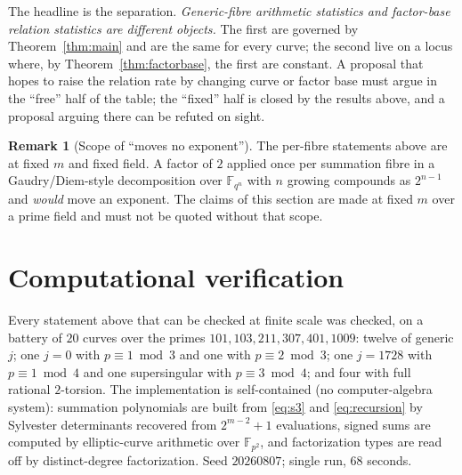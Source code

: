 \documentclass[11pt,a4paper]{article}
\theoremstyle{plain}
\theoremstyle{definition}
\newtheorem{remark}[theorem]{Remark}
\newcommand{\FF}{\mathbb{F}}
\begin{document}
The headline is the separation. \emph{Generic-fibre arithmetic statistics and
factor-base relation statistics are different objects.} The first are governed by
Theorem~\ref{thm:main} and are the same for every curve; the second live on a
locus where, by Theorem~\ref{thm:factorbase}, the first are constant. A proposal
that hopes to raise the relation rate by changing curve or factor base must argue
in the ``free'' half of the table; the ``fixed'' half is closed by the results
above, and a proposal arguing there can be refuted on sight.

\begin{remark}[Scope of ``moves no exponent'']
The per-fibre statements above are at fixed $m$ and fixed field. A factor of $2$
applied once per summation fibre in a Gaudry/Diem-style decomposition over
$\FF_{q^n}$ with $n$ growing compounds as $2^{n-1}$ and \emph{would} move an
exponent. The claims of this section are made at fixed $m$ over a prime field and
must not be quoted without that scope.
\end{remark}

\section{Computational verification}\label{sec:verify}

Every statement above that can be checked at finite scale was checked, on a
battery of $20$ curves over the primes $101, 103, 211, 307, 401, 1009$: twelve
of generic $j$; one $j = 0$ with $p \equiv 1 \bmod 3$ and one with
$p \equiv 2 \bmod 3$; one $j = 1728$ with $p \equiv 1 \bmod 4$ and one
supersingular with $p \equiv 3 \bmod 4$; and four with full rational $2$-torsion.
The implementation is self-contained (no computer-algebra system): summation
polynomials are built from \eqref{eq:s3} and \eqref{eq:recursion} by Sylvester
determinants recovered from $2^{m-2}+1$ evaluations, signed sums are computed by
elliptic-curve arithmetic over $\FF_{p^2}$, and factorization types are read off by
distinct-degree factorization. Seed $20260807$; single run, $68$ seconds.
\end{document}

